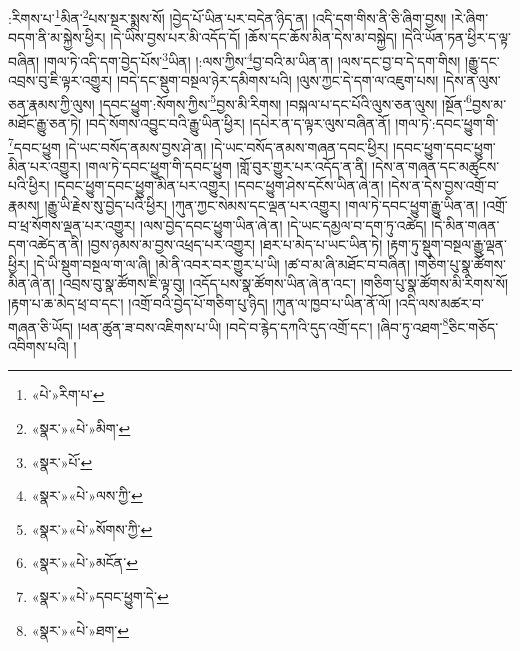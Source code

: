:རིགས་པ་\footnote{«པེ་»རིག་པ་}མིན་\footnote{«སྣར་»«པེ་»མིག་}པས་སྔར་སྨྲས་སོ། །བྱེད་པོ་ཡིན་པར་བདེན་ཉིད་ན། །འདི་དག་གིས་ནི་ཅི་ཞིག་བྱས། །རེ་ཞིག་བདག་ནི་མ་སྐྱེས་ཕྱིར། །དེ་ཡིས་བྱས་པར་མི་འདོད་དོ། །ཆོས་དང་ཆོས་མིན་དེས་མ་བསྐྱེད། །དེའི་ཡོན་ཏན་ཕྱིར་ད་ལྟ་བཞིན། །གལ་ཏེ་འདི་དག་བྱེད་པོས་\footnote{«སྣར་»པོ་}ཡིན། །:ལས་ཀྱིས་\footnote{«སྣར་»«པེ་»ལས་ཀྱི་}བྱ་བའི་མ་ཡིན་ན། །ལས་དང་བྱ་བ་དེ་དག་གིས། །རྒྱུ་དང་འབྲས་བུ་ཇི་ལྟར་འགྱུར། །བདེ་དང་སྡུག་བསྔལ་ཉེར་དམིགས་པའི། །ལུས་ཀྱང་དེ་དག་ལ་འཇུག་པས། །དེས་ན་ལུས་ཅན་རྣམས་ཀྱི་ལུས། །དབང་ཕྱུག་:སོགས་ཀྱིས་\footnote{«སྣར་»«པེ་»སོགས་ཀྱི་}བྱས་མི་རིགས། །བསྐལ་པ་དང་པོའི་ལུས་ཅན་ལུས། །སྔོན་\footnote{«སྣར་»«པེ་»མངོན་}བྱས་མ་མཐོང་རྒྱུ་ཅན་ཏེ། །བདེ་སོགས་འབྱུང་བའི་རྒྱུ་ཡིན་ཕྱིར། །དཔེར་ན་ད་ལྟར་ལུས་བཞིན་ནོ། །གལ་ཏེ་:དབང་ཕྱུག་གི་\footnote{«སྣར་»«པེ་»དབང་ཕྱུག་དེ་}དབང་ཕྱུག །དེ་ཡང་བསོད་ནམས་བྱས་ཤེ་ན། །དེ་ཡང་བསོད་ནམས་གཞན་དབང་ཕྱིར། །དབང་ཕྱུག་དབང་ཕྱུག་མིན་པར་འགྱུར། །གལ་ཏེ་དབང་ཕྱུག་གི་དབང་ཕྱུག །གློ་བུར་གྱུར་པར་འདོད་ན་ནི། །དེས་ན་གཞན་དང་མཚུངས་པའི་ཕྱིར། །དབང་ཕྱུག་དབང་ཕྱུག་མིན་པར་འགྱུར། །དབང་ཕྱུག་ཤེས་དངོས་ཡིན་ཞེ་ན། །དེས་ན་དེས་བྱས་འགྲོ་བ་རྣམས། །རྒྱུ་ཡི་རྗེས་སུ་བྱེད་པའི་ཕྱིར། །ཀུན་ཀྱང་སེམས་དང་ལྡན་པར་འགྱུར། །གལ་ཏེ་དབང་ཕྱུག་རྒྱུ་ཡིན་ན། །འགྲོ་བ་ཕྲ་སོགས་ལྡན་པར་འགྱུར། །ལས་བྱེད་དབང་ཕྱུག་ཡིན་ཞེ་ན། །དེ་ཡང་དམྱལ་བ་དག་ཏུ་འཚེད། །དེ་མིན་གཞན་དག་འཚེད་ན་ནི། །བྱས་ཉམས་མ་བྱས་འཕྲད་པར་འགྱུར། །ཐར་པ་མེད་པ་ཡང་ཡིན་ཏེ། །རྟག་ཏུ་སྡུག་བསྔལ་རྒྱུ་ལྡན་ཕྱིར། །དེ་ཡི་སྡུག་བསྔལ་ག་ལ་ཞི། །མེ་ནི་འབར་བར་གྱུར་པ་ཡི། །ཚ་བ་མ་ཞི་མཐོང་བ་བཞིན། །གཅིག་པུ་སྣ་ཚོགས་མིན་ཞེ་ན། །འབྲས་བུ་སྣ་ཚོགས་ཇི་ལྟ་བུ། །འདོད་པས་སྣ་ཚོགས་ཡིན་ཞེ་ན་འང་། །གཅིག་པུ་སྣ་ཚོགས་མི་རིགས་སོ། །རྟག་པ་ཆ་མེད་ཕྲ་བ་དང་། །འགྲོ་བའི་བྱེད་པོ་གཅིག་པུ་ཉིད། །ཀུན་ལ་ཁྱབ་པ་ཡིན་ནོ་ལོ། །འདི་ལས་མཚར་བ་གཞན་ཅི་ཡོད། །ཕན་ཚུན་ཟ་བས་འཇིགས་པ་ཡི། །བདེ་བ་རྙེད་དཀའི་དུད་འགྲོ་དང་། །ཞིབ་ཏུ་འཐག་\footnote{«སྣར་»«པེ་»ཐག་}ཅིང་གཅོད་འབིགས་པའི། །
